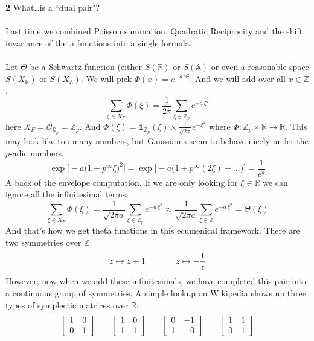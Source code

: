 \documentclass[12pt]{article}
\begin{document}
\noindent \textbf{2} \indent What\dots is a ``dual pair"? \\ \\
Last time we combined Poisson summation, Quadratic Reciprocity and the shift invariance of theta functions into a single formula.  \\ \\
Let $\Theta$ be a Schwartz function (either $S(\mathbb{R})$ or $S(\mathbb{A})$ or even a reasonable space $S(X_\mathbb{R})$ or $S(X_\mathbb{A})$. We will pick $\Phi(x) = e^{- a \, x^2}$.  And we will add over all $x \in \mathbb{Z}$.
$$ \sum_{\xi \in X_F} \Phi( \xi)  = \frac{1}{2\pi} \sum_{\xi \in \mathbb{Z}_p} e^{-a \, \xi^2}$$
here $X_F = \mathcal{O}_{\mathbb{Q}_p} = \mathbb{Z}_p$.  And $\Phi(\xi) = \mathbf{1}_{\mathbb{Z}_p}(\xi) \times \frac{1}{\sqrt{2\pi}} e^{-\xi^2}$ where $\Phi :\mathbb{Z}_p \times \mathbb{R}  \to\mathbb{R} $.  This may look like too many numbers, but Gaussian's seem to behave nicely under the $p$-adic numbers.
$$ \exp \bigg[ - a\big(1 + p^\infty \xi \big)^2 \bigg] = 
\exp \bigg[ -  a \big( 1 + p^\infty (2\xi) + \dots \big) \bigg] = \frac{1}{e^a} $$
A back of the envelope computation. If we are only looking for $\xi \in \mathbb{R}$ we can ignore all the infinitesimal terms:
$$  \sum_{\xi \in X_F} \Phi( \xi)  = \frac{1}{\sqrt{2\pi a}} \sum_{\xi \in \mathbb{Z}_p} e^{-a \, \xi^2} \approx 
\frac{1}{\sqrt{2\pi a}} \sum_{\xi \in \mathbb{Z}} e^{-a \, \xi^2} = \Theta(\xi)
$$
And that's how we get theta functions in this ecumenical framework. There are two symmetries over $\mathbb{Z}$ 
$$ z \mapsto z + 1 \hspace{0.5in} z \mapsto -\frac{1}{z} $$ 
However, now when we add these infinitesimals, we have completed this pair into a continuous group of symmetries.  A simple lookup on Wikipedia shows up three types of symplectic matrices over $\mathbb{R}$:
$$ 
\left[ \begin{array}{cc} 1 & 0 \\ 0 & 1 \end{array} \right] 
\hspace{0.25in}
\left[ \begin{array}{cc} 1 & 0 \\ 1 & 1 \end{array} \right]
\hspace{0.25in}
\left[ \begin{array}{cr} 0 & -1 \\ 1 & 0 \end{array} \right] 
\hspace{0.25in}
\left[ \begin{array}{cc} 1 & 1 \\ 0 & 1 \end{array} \right] $$
\end{document}
